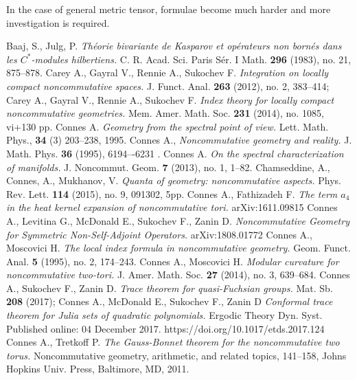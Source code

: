 \documentclass{article}
\newcommand{\archeading}[1]{\vspace{.3cm} \noindent{\bfseries #1} \vspace{.1cm}   }
\begin{document}
In the case of general metric tensor, formulae become much harder and more investigation is required.

\bigskip\archeading{Future Fellowship Candidate}

\begin{thebibliography}{99}
\setlength{\itemsep}{0 pt}
\setlength{\parskip}{0pt}
\setlength{\parsep}{0pt}
 Baaj, S., Julg, P. {\it Th\'eorie bivariante de Kasparov et op\'erateurs non born\'es dans les $C^*$-modules hilbertiens.} C. R. Acad. Sci. Paris S\'er. I Math. {\bf 296} (1983), no. 21, 875--878.
 Carey A., Gayral V., Rennie A., Sukochev F. {\it Integration on locally compact noncommutative spaces.} J. Funct. Anal. {\bf 263} (2012), no. 2, 383--414; Carey A., Gayral V., Rennie A., Sukochev F. {\it Index theory for locally compact noncommutative geometries.} Mem. Amer. Math. Soc. {\bf 231} (2014), no. 1085, vi+130 pp.
 Connes A. {\it Geometry from the spectral point of view.} Lett. Math. Phys., {\bf 34} (3) 203--238, 1995.
 Connes A., {\it Noncommutative geometry and reality.} J. Math. Phys. {\bf 36} (1995), 6194–-6231 .
 Connes A. {\it On the spectral characterization of manifolds.} J. Noncommut. Geom. {\bf 7} (2013), no. 1, 1--82.
 Chamseddine, A., Connes, A., Mukhanov, V. {\it Quanta of geometry: noncommutative aspects.} Phys. Rev. Lett. {\bf 114} (2015), no. 9, 091302, 5pp.
 Connes A., Fathizadeh F. {\it The term $a_4$ in the heat kernel expansion of noncommutative tori.} arXiv:1611.09815
 Connes A., Levitina G., McDonald E., Sukochev F., Zanin D. {\it Noncommutative Geometry for Symmetric Non-Self-Adjoint Operators.} arXiv:1808.01772 
 Connes A., Moscovici H. {\it The local index formula in noncommutative geometry.} Geom. Funct. Anal. {\bf 5} (1995), no. 2, 174--243.
 Connes A., Moscovici H. {\it Modular curvature for noncommutative two-tori.} J. Amer. Math. Soc. {\bf 27} (2014), no. 3, 639--684.
 Connes A., Sukochev F., Zanin D. {\it Trace theorem for quasi-Fuchsian groups.} Mat. Sb. {\bf 208} (2017); Connes A., McDonald E., Sukochev F., Zanin D {\it Conformal trace theorem for Julia sets of quadratic polynomials.} Ergodic Theory Dyn. Syst. Published online: 04 December 2017. https://doi.org/10.1017/etds.2017.124
 Connes A., Tretkoff P. {\it The Gauss-Bonnet theorem for the noncommutative two torus.} Noncommutative geometry, arithmetic, and related topics, 141--158, Johns Hopkins Univ. Press, Baltimore, MD, 2011.

\end{thebibliography}
\end{document}
